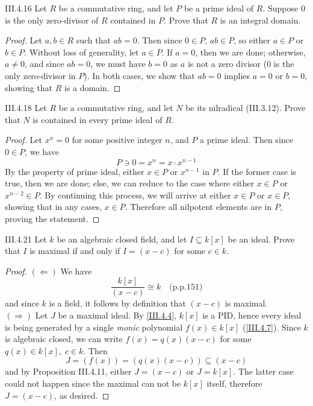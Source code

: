 \begin{problem}{III.4.16}
Let $R$ be a commutative ring, and let $P$ be a prime ideal of $R$. Suppose $0$ is the only zero-divisor of $R$ contained in $P$. Prove that $R$ is an integral domain. 
\end{problem}
\begin{proof}
Let $a,b \in R$ such that $ab = 0$. Then since $0 \in P$, $ab \in P$, so either $a\in P$ or $b \in P$. Without loss of generality, let $a \in P$. If $a = 0$, then we are done; otherwise, $a \neq 0$, and since $ab = 0$, we must have $b = 0$ as $a$ is not a zero divisor ($0$ is the only zero-divisor in $P$). In both cases, we show that $ab = 0$ implies $a = 0$ or $b = 0$, showing that $R$ is a domain.
\end{proof}

\begin{problem}{III.4.18}
Let $R$ be a commutative ring, and let $N$ be its nilradical (III.3.12). Prove that $N$ is contained in every prime ideal of $R$.
\end{problem}
\begin{proof}
Let $x^n = 0$ for some positive integer $n$, and $P$ a prime ideal. Then since $0 \in P$, we have
\[
P \ni 0 = x^n = x \cdot x^{n-1}
\]
By the property of prime ideal, either $x \in P$ or $x^{n-1}$ in $P$. If the former case is true, then we are done; else, we can reduce to the case where either $x \in P$ or $x^{n-2} \in P$. By continuing this process, we will arrive at either $x \in P$ or $x \in P$, showing that in any cases, $x \in P$. Therefore all nilpotent elements are in $P$, proving the statement. 
\end{proof}

\begin{problem}{III.4.21}
Let $k$ be an algebraic closed field, and let $I \subseteq k[x]$ be an ideal. Prove that $I$ is maximal if and only if $I = (x-c)$ for some $c \in k$.
\end{problem}
\begin{proof}

\noindent $(\Leftarrow)$ We have 
\[
\frac{k[x]}{(x-c)} \cong k 	\quad \text{(p.p.151)}	
\]
and since $k$ is a field, it follows by definition that $(x-c)$ is maximal. \\
$(\Rightarrow)$ Let $J$ be a maximal ideal. By \ref{III.4.4}, $k[x]$ is a PID, hence every ideal is being generated by a single \emph{monic} polynomial $f(x) \in k[x]$ (\ref{III.4.7}). Since $k$ is algebraic closed, we can write $f(x) = q(x)(x-c)$ for some $q(x) \in k[x],\; c \in k$. Then  
\[
J = (f(x)) = (q(x)(x-c)) \subseteq (x-c)
\]
and by Proposition III.4.11, either $J = (x-c)$ or $J = k[x]$. The latter case could not happen since the maximal can not be $k[x]$ itself, therefore $J = (x-c)$, as desired. 
\end{proof}

